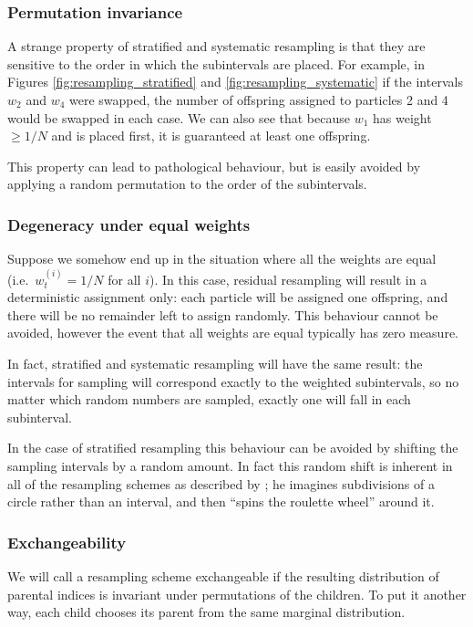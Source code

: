 \documentclass[fleqn]{article}
\theoremstyle{definition}
\newcommand{\wt}[2][t]{w_{#1}^{(#2)}}
\begin{document}
\subsubsection{Permutation invariance}
A strange property of stratified and systematic resampling is that they are sensitive to the order in which the subintervals are placed. For example, in Figures \ref{fig:resampling_stratified} and \ref{fig:resampling_systematic} if the intervals $w_2$ and $w_4$ were swapped, the number of offspring assigned to particles 2 and 4 would be swapped in each case. 
We can also see that because $w_1$ has weight $\geq 1/N$ and is placed first, it is guaranteed at least one offspring.

This property can lead to pathological behaviour, but is easily avoided by applying a random permutation to the order of the subintervals.

\subsubsection{Degeneracy under equal weights}
Suppose we somehow end up in the situation where all the weights are equal (i.e.\ $\wt{i} = 1/N$ for all $i$).
In this case, residual resampling will result in a deterministic assignment only: each particle will be assigned one offspring, and there will be no remainder left to assign randomly. This behaviour cannot be avoided, however the event that all weights are equal typically has zero measure.

In fact, stratified and systematic resampling will have the same result: the intervals for sampling will correspond exactly to the weighted subintervals, so no matter which random numbers are sampled, exactly one will fall in each subinterval.

In the case of stratified resampling this behaviour can be avoided by shifting the sampling intervals by a random amount. In fact this random shift is inherent in all of the resampling schemes as described by \citet{whitley1994}; he imagines subdivisions of a circle rather than an interval, and then ``spins the roulette wheel'' around it.

\subsubsection{Exchangeability}
We will call a resampling scheme exchangeable if the resulting distribution of parental indices is invariant under permutations of the children. To put it another way, each child chooses its parent from the same marginal distribution.
\end{document}
